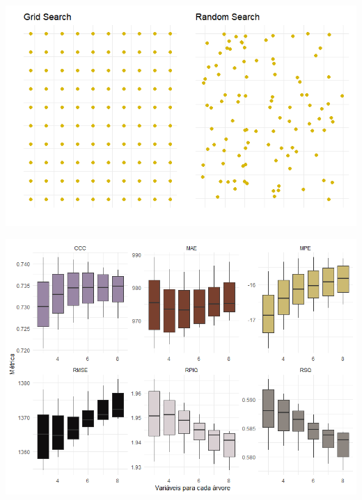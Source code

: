 \documentclass{beamer} %
\newcommand{\1}{\mathbb{I}}
\begin{document}
\begin{frame}
\includegraphics[scale = .60]{imagens/random_grid.png}
    
\end{frame}


\begin{frame}

\includegraphics[scale = .50]{imagens/cross_v_mtry.png}
    
\end{frame}
\end{document}
